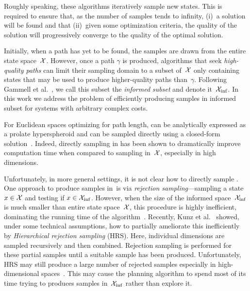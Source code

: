 \documentclass[letterpaper, 10 pt, conference]{ieeeconf}  %
\begin{document}
Roughly speaking, these algorithms iteratively sample new states.
This is required to ensure that, as the number of samples tends to infinity, 
(i)~a solution will be found 
and that
(ii)~given some optimization criteria, the quality of the solution will progressively converge to the quality of the optimal solution.

Initially, 
when a path has yet to be found, 
the samples are drawn from the entire state space~$\mathcal{X}$.
However, once a path $\gamma$ is produced,  algorithms that seek \emph{high-quality paths} can limit their sampling domain to a subset of~$\mathcal{X}$ only  containing states that may be used to produce higher-quality paths than~$\gamma$.
Following Gammell et al.~\cite{GSB14}, we call this subset the \emph{informed subset} and denote it~$\mathcal{X}_{\rm {inf}}$.
In this work we address the problem of efficiently producing samples in informed subset for systems with arbitrary complex costs. 

For Euclidean spaces optimizing for path length, 
\Cinf can be analytically expressed as a prolate hyperspheroid and can be sampled directly using a closed-form solution~\cite{GSB14}.
Indeed, directly sampling in \Cinf has been shown to dramatically improve computation time when compared to sampling in~$\mathcal{X}$, especially in high dimensions. 

Unfortunately, in more general settings,
it is not clear how to directly sample \Cinf.
%
One approach to produce samples in~\Cinf is via \emph{rejection sampling}---sampling a state $x \in \mathcal{X}$ and testing if $x \in \mathcal{X}_{\rm {inf}}$.
However, when the size of the informed space~$\mathcal{X}_{\rm {inf}}$ is much smaller than entire state space~$\mathcal{X}$, this procedure is highly inefficient, dominating the running time of the algorithm~\cite{KTC16}.
Recently, Kunz et al.~\cite{KTC16} showed, under some technical assumptions, how to partially ameliorate this inefficiently by \emph{Hierarchical rejection sampling} (HRS). 
Here, individual dimensions are sampled recursively 
and then combined. Rejection sampling is performed for these partial samples until a suitable sample has been produced. 
Unfortunately, HRS may still produce a large number of rejected samples especially in high-dimensional spaces~\cite{KTC16}.
This may cause the planning algorithm to spend most of its time trying to produces samples in~$\mathcal{X}_{\rm {inf}}$ rather than explore it.
\end{document}
